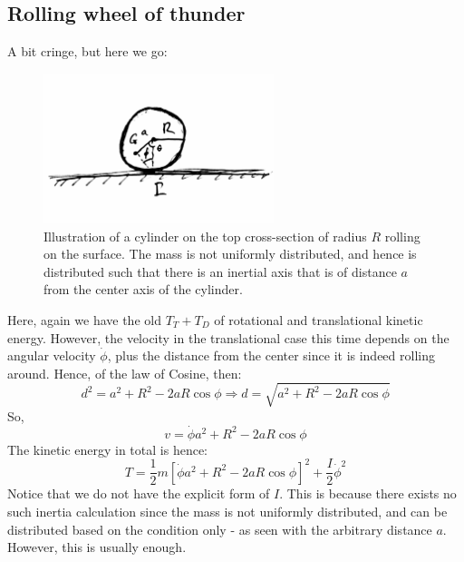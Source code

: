 \subsection{Rolling wheel of thunder}
A bit cringe, but here we go:
\begin{figure}[htb]
    \centering
    \includegraphics[width=0.6\textwidth]{img/c5_rolling.jpg}
    \caption{Illustration of a cylinder on the top cross-section of radius $R$ rolling on the surface. The mass is not uniformly distributed, and hence is distributed such that there is an inertial axis that is of distance $a$ from the center axis of the cylinder.}
\end{figure}
Here, again we have the old $T_{T}+T_{D}$ of rotational and translational kinetic energy. However, the velocity in the translational case this time depends on the angular velocity $\dot{\phi}$, plus the distance from the center since it is indeed rolling around. Hence, of the law of Cosine, then:
\begin{equation}
    d^{2} = a^{2} + R^{2} - 2aR \cos{\phi} \Rightarrow d = \sqrt{a^{2} + R^{2} - 2aR \cos{\phi}} 
\end{equation}
So, 
\begin{equation}
    v = \dot{\phi}a^{2} + R^{2} - 2aR \cos{\phi}
\end{equation}
The kinetic energy in total is hence:
\begin{equation}
    T = \frac{1}{2}m \left[\dot{\phi}a^{2} + R^{2} - 2aR \cos{\phi}\right]^{2} + \frac{I}{2}\dot{\phi}^{2}
\end{equation}
Notice that we do not have the explicit form of $I$. This is because there exists no such inertia calculation since the mass is not uniformly distributed, and can be distributed based on the condition only - as seen with the arbitrary distance $a$. However, this is usually enough. 